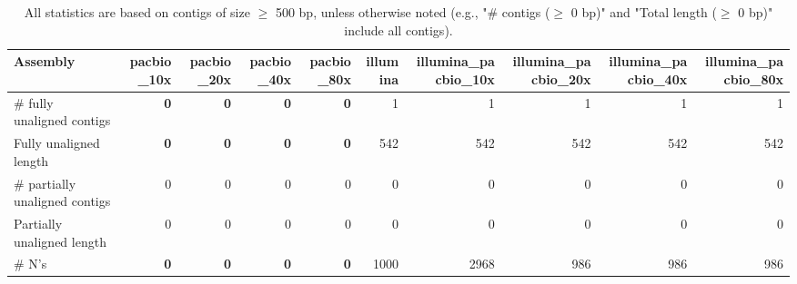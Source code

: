 \documentclass[12pt,a4paper]{article}
\begin{document}
\begin{table}[ht]
\begin{center}
\caption{All statistics are based on contigs of size $\geq$ 500 bp, unless otherwise noted (e.g., "\# contigs ($\geq$ 0 bp)" and "Total length ($\geq$ 0 bp)" include all contigs).}
\begin{tabular}{|l*{9}{|r}|}
\hline
Assembly & pacbio\_10x & pacbio\_20x & pacbio\_40x & pacbio\_80x & illumina & illumina\_pacbio\_10x & illumina\_pacbio\_20x & illumina\_pacbio\_40x & illumina\_pacbio\_80x \\ \hline
\# fully unaligned contigs & {\bf 0} & {\bf 0} & {\bf 0} & {\bf 0} & 1 & 1 & 1 & 1 & 1 \\ \hline
Fully unaligned length & {\bf 0} & {\bf 0} & {\bf 0} & {\bf 0} & 542 & 542 & 542 & 542 & 542 \\ \hline
\# partially unaligned contigs & 0 & 0 & 0 & 0 & 0 & 0 & 0 & 0 & 0 \\ \hline
Partially unaligned length & 0 & 0 & 0 & 0 & 0 & 0 & 0 & 0 & 0 \\ \hline
\# N's & {\bf 0} & {\bf 0} & {\bf 0} & {\bf 0} & 1000 & 2968 & 986 & 986 & 986 \\ \hline
\end{tabular}
\end{center}
\end{table}
\end{document}
